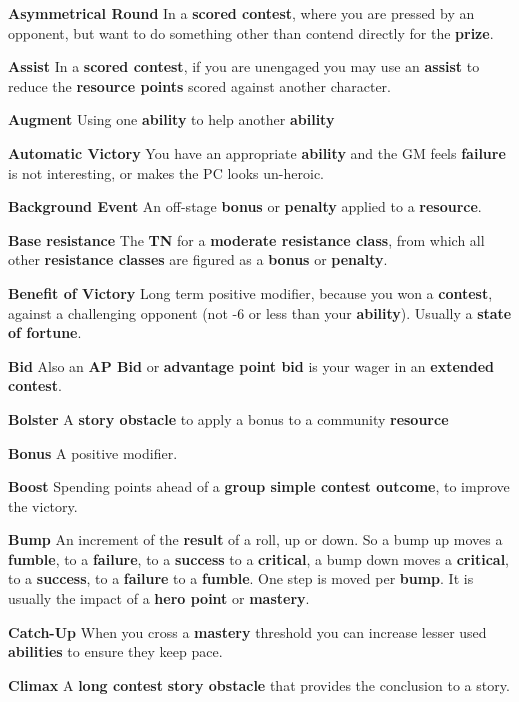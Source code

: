 \documentclass[
]{article}
\begin{document}
\textbf{Asymmetrical Round} In a \textbf{scored contest}, where you are
pressed by an opponent, but want to do something other than contend
directly for the \textbf{prize}.

\textbf{Assist} In a \textbf{scored contest}, if you are unengaged you
may use an \textbf{assist} to reduce the \textbf{resource points} scored
against another character.

\textbf{Augment} Using one \textbf{ability} to help another
\textbf{ability}

\textbf{Automatic Victory} You have an appropriate \textbf{ability} and
the GM feels \textbf{failure} is not interesting, or makes the PC looks
un-heroic.

\textbf{Background Event} An off-stage \textbf{bonus} or
\textbf{penalty} applied to a \textbf{resource}.

\textbf{Base resistance} The \textbf{TN} for a \textbf{moderate
resistance class}, from which all other \textbf{resistance classes} are
figured as a \textbf{bonus} or \textbf{penalty}.

\textbf{Benefit of Victory} Long term positive modifier, because you won
a \textbf{contest}, against a challenging opponent (not -6 or less than
your \textbf{ability}). Usually a \textbf{state of fortune}.

\textbf{Bid} Also an \textbf{AP Bid} or \textbf{advantage point bid} is
your wager in an \textbf{extended contest}.

\textbf{Bolster} A \textbf{story obstacle} to apply a bonus to a
community \textbf{resource}

\textbf{Bonus} A positive modifier.

\textbf{Boost} Spending points ahead of a \textbf{group simple contest
outcome}, to improve the victory.

\textbf{Bump} An increment of the \textbf{result} of a roll, up or down.
So a bump up moves a \textbf{fumble}, to a \textbf{failure}, to a
\textbf{success} to a \textbf{critical}, a bump down moves a
\textbf{critical}, to a \textbf{success}, to a \textbf{failure} to a
\textbf{fumble}. One step is moved per \textbf{bump}. It is usually the
impact of a \textbf{hero point} or \textbf{mastery}.

\textbf{Catch-Up} When you cross a \textbf{mastery} threshold you can
increase lesser used \textbf{abilities} to ensure they keep pace.

\textbf{Climax} A \textbf{long contest} \textbf{story obstacle} that
provides the conclusion to a story.
\end{document}

